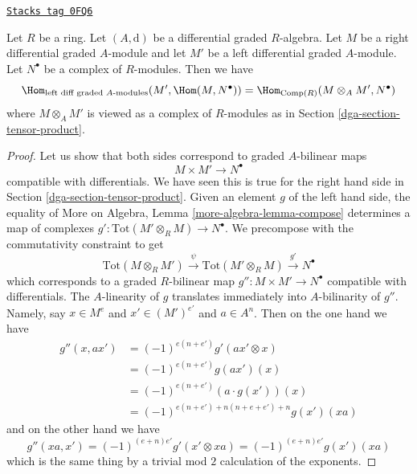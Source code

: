 \begin{lemma}
\label{dga-lemma-characterize-hom-other-side}
\href{https://stacks.math.columbia.edu/tag/0FQ6}{\texttt{Stacks tag 0FQ6}}

Let $R$ be a ring. Let $(A, \text{d})$ be a differential graded $R$-algebra.
Let $M$ be a right differential graded $A$-module and let
$M'$ be a left differential graded $A$-module.
Let $N^\bullet$ be a complex of $R$-modules. Then we have
$$
\Hom_{\text{left diff graded }A\text{-modules}}(M', \Hom(M, N^\bullet)) =
\Hom_{\text{Comp}(R)}(M \otimes_A M', N^\bullet)
$$
where $M \otimes_A M'$ is viewed as a complex of $R$-modules
as in Section \ref{dga-section-tensor-product}.
\end{lemma}

\begin{proof}
Let us show that both sides correspond to graded $A$-bilinear maps
$$
M \times M' \longrightarrow N^\bullet
$$
compatible with differentials. We have seen this is true for the right
hand side in Section \ref{dga-section-tensor-product}. Given an element
$g$ of the left hand side, the equality of
More on Algebra, Lemma \ref{more-algebra-lemma-compose}
determines a map of complexes
$g' : \text{Tot}(M' \otimes_R M) \to N^\bullet$.
We precompose with the commutativity constraint to get
$$
\text{Tot}(M \otimes_R M') \xrightarrow{\psi}
\text{Tot}(M' \otimes_R M) \xrightarrow{g'}
N^\bullet
$$
which corresponds to a graded $R$-bilinear
map $g'' : M \times M' \to N^\bullet$ compatible with differentials.
The $A$-linearity of $g$ translates immediately into $A$-bilinarity of $g''$.
Namely, say $x \in M^e$ and $x' \in (M')^{e'}$ and $a \in A^n$. Then
on the one hand we have
\begin{align*}
g''(x, ax')
& =
(-1)^{e(n + e')} g'(ax' \otimes x) \\
& =
(-1)^{e(n + e')} g(ax')(x) \\
& =
(-1)^{e(n + e')} (a \cdot g(x'))(x) \\
& =
(-1)^{e(n + e') + n(n + e + e') + n} g(x')(xa)
\end{align*}
and on the other hand we have
$$
g''(xa, x') = (-1)^{(e + n)e'} g'(x' \otimes xa) =
(-1)^{(e + n)e'} g(x')(xa)
$$
which is the same thing by a trivial mod $2$ calculation of the exponents.
\end{proof}


